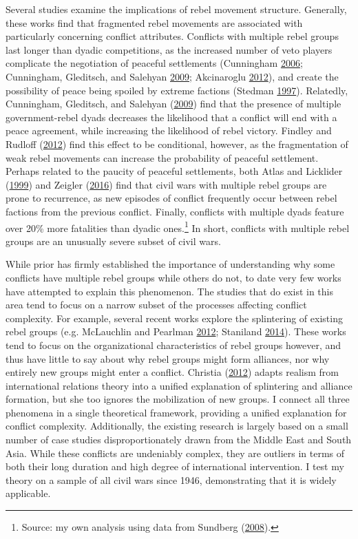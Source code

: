 \documentclass[12pt,]{book}
\let\rmarkdownfootnote\footnote%
\def\footnote{\protect\rmarkdownfootnote}
\theoremstyle{definition}
\theoremstyle{definition}
\theoremstyle{remark}
\begin{document}
Several studies examine the implications of rebel movement structure.
Generally, these works find that fragmented rebel movements are
associated with particularly concerning conflict attributes. Conflicts
with multiple rebel groups last longer than dyadic competitions, as the
increased number of veto players complicate the negotiation of peaceful
settlements (Cunningham \protect\hyperlink{ref-Cunningham2006}{2006};
Cunningham, Gleditsch, and Salehyan
\protect\hyperlink{ref-Cunningham2009}{2009}; Akcinaroglu
\protect\hyperlink{ref-Akcinaroglu2012}{2012}), and create the
possibility of peace being spoiled by extreme factions (Stedman
\protect\hyperlink{ref-Stedman1997}{1997}). Relatedly, Cunningham,
Gleditsch, and Salehyan (\protect\hyperlink{ref-Cunningham2009}{2009})
find that the presence of multiple government-rebel dyads decreases the
likelihood that a conflict will end with a peace agreement, while
increasing the likelihood of rebel victory. Findley and Rudloff
(\protect\hyperlink{ref-Findley2012}{2012}) find this effect to be
conditional, however, as the fragmentation of weak rebel movements can
increase the probability of peaceful settlement. Perhaps related to the
paucity of peaceful settlements, both Atlas and Licklider
(\protect\hyperlink{ref-Atlas1999}{1999}) and Zeigler
(\protect\hyperlink{ref-Zeigler2016}{2016}) find that civil wars with
multiple rebel groups are prone to recurrence, as new episodes of
conflict frequently occur between rebel factions from the previous
conflict. Finally, conflicts with multiple dyads feature over 20\% more
fatalities than dyadic ones.\footnote{Source: my own analysis using data
  from Sundberg (\protect\hyperlink{ref-Sundberg2008a}{2008}).} In
short, conflicts with multiple rebel groups are an unusually severe
subset of civil wars.

While prior has firmly established the importance of understanding why
some conflicts have multiple rebel groups while others do not, to date
very few works have attempted to explain this phenomenon. The studies
that do exist in this area tend to focus on a narrow subset of the
processes affecting conflict complexity. For example, several recent
works explore the splintering of existing rebel groups (e.g. McLauchlin
and Pearlman \protect\hyperlink{ref-McLauchlin2012}{2012}; Staniland
\protect\hyperlink{ref-Staniland2014}{2014}). These works tend to focus
on the organizational characteristics of rebel groups however, and thus
have little to say about why rebel groups might form alliances, nor why
entirely new groups might enter a conflict. Christia
(\protect\hyperlink{ref-Christia2012}{2012}) adapts realism from
international relations theory into a unified explanation of splintering
and alliance formation, but she too ignores the mobilization of new
groups. I connect all three phenomena in a single theoretical framework,
providing a unified explanation for conflict complexity. Additionally,
the existing research is largely based on a small number of case studies
disproportionately drawn from the Middle East and South Asia. While
these conflicts are undeniably complex, they are outliers in terms of
both their long duration and high degree of international intervention.
I test my theory on a sample of all civil wars since 1946, demonstrating
that it is widely applicable.
\end{document}
